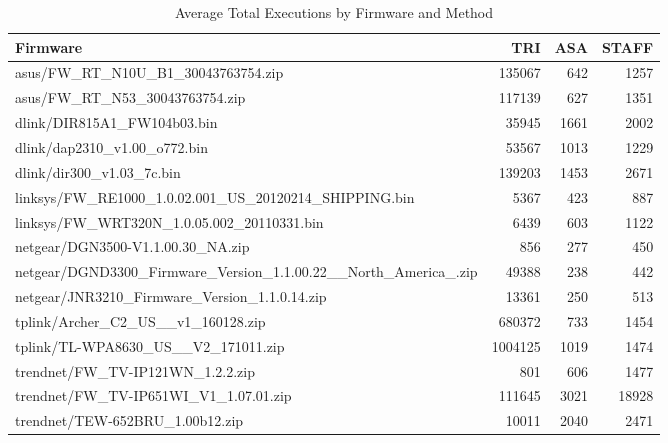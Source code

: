 \begin{table}[htbp]
\centering
\caption{Average Total Executions by Firmware and Method}
\label{tab:total_execs}
\begin{tabular}{lrrr}
\toprule
Firmware & TRI & ASA & STAFF \\
\midrule
asus/FW_RT_N10U_B1_30043763754.zip & 135067 & 642 & 1257 \\
asus/FW_RT_N53_30043763754.zip & 117139 & 627 & 1351 \\
dlink/DIR815A1_FW104b03.bin & 35945 & 1661 & 2002 \\
dlink/dap2310_v1.00_o772.bin & 53567 & 1013 & 1229 \\
dlink/dir300_v1.03_7c.bin & 139203 & 1453 & 2671 \\
linksys/FW_RE1000_1.0.02.001_US_20120214_SHIPPING.bin & 5367 & 423 & 887 \\
linksys/FW_WRT320N_1.0.05.002_20110331.bin & 6439 & 603 & 1122 \\
netgear/DGN3500-V1.1.00.30_NA.zip & 856 & 277 & 450 \\
netgear/DGND3300_Firmware_Version_1.1.00.22__North_America_.zip & 49388 & 238 & 442 \\
netgear/JNR3210_Firmware_Version_1.1.0.14.zip & 13361 & 250 & 513 \\
tplink/Archer_C2_US__v1_160128.zip & 680372 & 733 & 1454 \\
tplink/TL-WPA8630_US__V2_171011.zip & 1004125 & 1019 & 1474 \\
trendnet/FW_TV-IP121WN_1.2.2.zip & 801 & 606 & 1477 \\
trendnet/FW_TV-IP651WI_V1_1.07.01.zip & 111645 & 3021 & 18928 \\
trendnet/TEW-652BRU_1.00b12.zip & 10011 & 2040 & 2471 \\
\bottomrule
\end{tabular}
\end{table}
